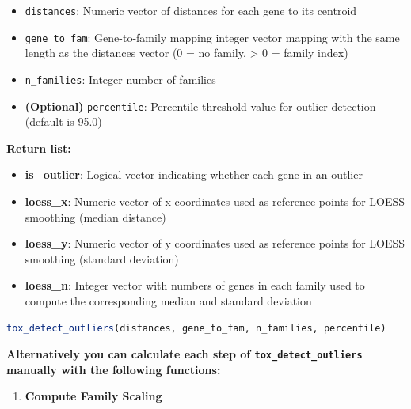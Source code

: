 \begin{enumerate}
          \begin{itemize}
            \item \texttt{distances}: Numeric vector of distances for each gene to its
                  centroid
                  
            \item \texttt{gene\_to\_fam}: Gene-to-family mapping integer vector mapping
                  with the same length as the distances vector (0 = no family, \textgreater
                  0 = family index)
                  
            \item \texttt{n\_families}: Integer number of families
                  
            \item \textbf{(Optional)} \texttt{percentile}: Percentile threshold
                  value for outlier detection (default is 95.0)
          \end{itemize}
          
          \textbf{Return list:}
          \begin{itemize}
            \item \textbf{is\_outlier}: Logical vector indicating whether each gene in
                  an outlier
                  
            \item \textbf{loess\_x}: Numeric vector of x coordinates used as reference
                  points for LOESS smoothing (median distance)
                  
            \item \textbf{loess\_y}: Numeric vector of y coordinates used as reference
                  points for LOESS smoothing (standard deviation)
                  
            \item \textbf{loess\_n}: Integer vector with numbers of genes in each family
                  used to compute the corresponding median and standard deviation
          \end{itemize}
          
          \begin{lstlisting}[language=R, caption={R Gene Outlier Calculation}]
tox_detect_outliers(distances, gene_to_fam, n_families, percentile)
          \end{lstlisting}
          
          \textbf{Alternatively you can calculate each step of \texttt{tox\_detect\_outliers}
          manually with the following functions:}
          \begin{enumerate}
            \item \textbf{Compute Family Scaling}
                  

\end{enumerate}
\end{enumerate}
